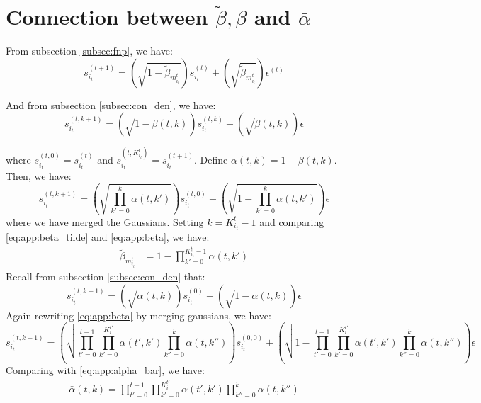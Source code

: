 \section{Connection between $\tilde{\beta}, \beta$ and $\bar{\alpha}$}
\label{app:sec:beta_connection}
From subsection \ref{subsec:fnp}, we have:
\begin{equation}
\label{eq:app:beta_tilde}
    s^{(t+1)}_{i_t} = \left(\sqrt{1 - \tilde{\beta}_{m_{i_t}^t}}\right) s^{(t)}_{i_t} + \left(\sqrt{\tilde{\beta}_{m_{i_t}^t}}\right) \epsilon^{(t)}
\end{equation}
    
And from subsection \ref{subsec:con_den}, we have:
\begin{equation}
\label{eq:app:beta}
    s^{(t, k+1)}_{i_t} = \left(\sqrt{1 - {\beta}(t, k)}\right) s^{(t, k)}_{i_t} + \left(\sqrt{{\beta}(t, k)}\right) \epsilon
\end{equation}

where $s^{(t, 0)}_{i_t} = s^{(t)}_{i_t}$ and $s^{(t, K_{i_t}^t)}_{i_t} = s^{(t+1)}_{i_t}$. Define ${\alpha}(t, k) = 1 - {\beta}(t, k)$. Then, we have:
$$
    s^{(t, k+1)}_{i_t} = \left(\sqrt{\prod_{k' = 0}^k{\alpha}(t, k')}\right) s^{(t, 0)}_{i_t} + \left(\sqrt{1 - {\prod_{k' = 0}^k{\alpha}(t, k')}}\right) \epsilon
$$
where we have merged the Gaussians. Setting $k = K_{i_t}^{t}-1$ and comparing \eqref{eq:app:beta_tilde} and \eqref{eq:app:beta}, we have:
\begin{align}\label{eq:beta_tilde}
    \tilde{\beta}_{m_{i_t}^t} &= 1 - {\prod_{k' = 0}^{K_{i_t}^t - 1}{\alpha}(t, k')}
\end{align}
Recall from subsection \ref{subsec:con_den} that:
\begin{equation}
\label{eq:app:alpha_bar}
    s^{(t, k+1)}_{i_t} = \left(\sqrt{\bar{\alpha}(t, k)}\right) s^{(0)}_{i_t} + \left(\sqrt{1 - \bar{\alpha}(t, k)}\right) \epsilon
\end{equation}
Again rewriting \eqref{eq:app:beta} by merging gaussians, we have:
$$
    s^{(t, k+1)}_{i_t} = \left(\sqrt{\prod_{t' = 0}^{t-1}\prod_{k' = 0}^{K_i^{t'}}{\alpha}(t', k') \prod_{k''=0}^k \alpha(t,k'')}\right) s^{(0, 0)}_{i_t} + \left(\sqrt{1 - {\prod_{t' = 0}^{t-1}\prod_{k' = 0}^{K_i^{t'}}{\alpha}(t', k') \prod_{k''=0}^k \alpha(t,k'')}}\right) \epsilon
$$
Comparing with \eqref{eq:app:alpha_bar}, we have:
\begin{align}
\label{eq:alpha_rel}
    {\bar{\alpha}(t, k)} = \prod_{t' = 0}^{t-1}\prod_{k' = 0}^{K_i^{t'}}{\alpha}(t', k') \prod_{k''=0}^k \alpha(t,k'')
\end{align}

\newpage